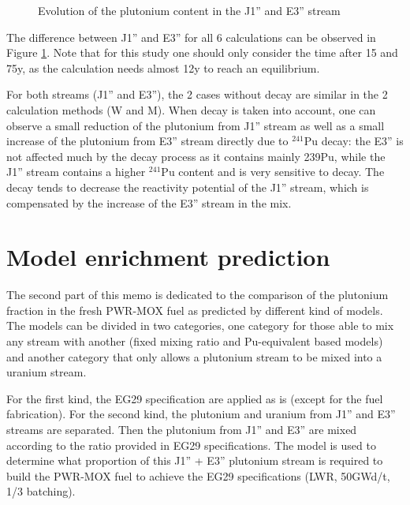 \documentclass[12pt]{article}
\begin{document}
\begin{figure}[h!]
  \centering
  \caption{Evolution of the plutonium content in the J1'' and  E3'' stream\label{fig:MW_flow} }
\end{figure}

The difference between J1'' and E3'' for all 6 calculations can be observed in
Figure \ref{fig:MW_flow}. Note that for this study one should only consider the time
after 15 and 75y, as the calculation needs almost 12y to reach an equilibrium. 

For both streams (J1'' and E3''), the 2 cases without decay are similar in the 2
calculation methods (W and M). When decay is taken into account, one can
observe a small reduction of the plutonium from  J1'' stream as well as a small
increase of the plutonium from E3'' stream directly due to $^{241}$Pu decay: the E3''
is not affected much by the decay process as it contains mainly 239Pu, while the J1''
stream contains a higher $^{241}$Pu content and is very sensitive to decay.  The decay tends
to decrease the reactivity potential of the J1'' stream, which is compensated by
the increase of the E3'' stream in the mix.


\section{Model enrichment prediction}

The second part of this memo is dedicated to the comparison of the plutonium
fraction in the fresh PWR-MOX fuel as predicted by different kind of models. The
models can be divided in two categories, one category for those able to mix any stream with
another (fixed mixing ratio and Pu-equivalent based models) and another category that only allows a plutonium stream to be mixed into a uranium stream.  

For the first kind, the EG29 specification are applied as is (except for the
fuel fabrication). For the second kind, the plutonium and uranium from J1'' and
E3'' streams are separated.  Then the plutonium from J1'' and E3'' are mixed
according to the ratio provided in EG29 specifications. The model is used to
determine what proportion of this J1'' + E3'' plutonium stream is required to
build the PWR-MOX fuel to achieve the EG29 specifications (LWR, 50GWd/t, 1/3
batching).
\end{document}
